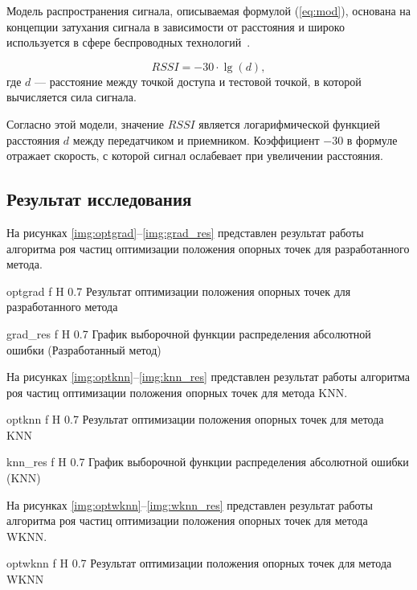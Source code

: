 Модель распространения сигнала, описываемая формулой (\ref{eq:mod}), основана на концепции затухания сигнала в зависимости от расстояния и широко используется в сфере беспроводных технологий~\cite{propagation}.

\begin{equation}
    RSSI = -30 \cdot \lg(d),
    \label{eq:mod}
\end{equation}
где $d$ --- расстояние между точкой доступа и тестовой точкой, в которой вычисляется сила сигнала.

Согласно этой модели, значение $RSSI$ является логарифмической функцией расстояния $d$ между передатчиком и приемником. Коэффициент $-30$ в формуле отражает скорость, с которой сигнал ослабевает при увеличении расстояния.

\clearpage

\subsection{Результат исследования}

На рисунках \ref{img:optgrad}--\ref{img:grad_res} представлен результат работы алгоритма роя частиц оптимизации положения опорных точек для разработанного метода.

    {optgrad}
    {f}
    {H}
    {0.7\linewidth}
    {Результат оптимизации положения опорных точек для разработанного метода}

    {grad_res}
    {f}
    {H}
    {0.7\linewidth}
    {График выборочной функции распределения абсолютной ошибки (Разработанный метод)}

На рисунках \ref{img:optknn}--\ref{img:knn_res} представлен результат работы алгоритма роя частиц оптимизации положения опорных точек для метода KNN.

    {optknn}
    {f}
    {H}
    {0.7\linewidth}
    {Результат оптимизации положения опорных точек для метода KNN}

    {knn_res}
    {f}
    {H}
    {0.7\linewidth}
    {График выборочной функции распределения абсолютной ошибки (KNN)}

\clearpage

На рисунках \ref{img:optwknn}--\ref{img:wknn_res} представлен результат работы алгоритма роя частиц оптимизации положения опорных точек для метода WKNN.

    {optwknn}
    {f}
    {H}
    {0.7\linewidth}
    {Результат оптимизации положения опорных точек для метода WKNN}

